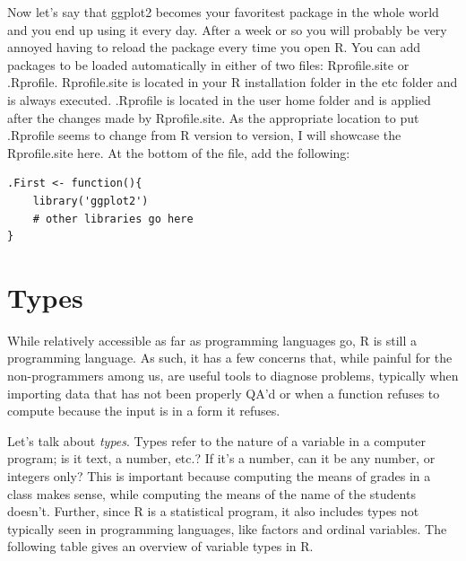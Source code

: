 \documentclass{report}
\newcommand{\code}[1]{\textsf{\ttfamily #1}}
\begin{document}
	Now let's say that \code{ggplot2} becomes your favoritest package in the whole world and you end up using it every day. After a week or so you will probably be very annoyed having to reload the package every time you open R. You can add packages to be loaded automatically in either of two files: \code{Rprofile.site} or \code{.Rprofile}. \code{Rprofile.site} is located in your R installation folder in the etc folder and is always executed. \code{.Rprofile} is located in the user home folder and is applied after the changes made by \code{Rprofile.site}. As the appropriate location to put \code{.Rprofile} seems to change from R version to version, I will showcase the \code{Rprofile.site} here. At the bottom of the file, add the following:
	\begin{verbatim}
.First <- function(){
	library('ggplot2')
	# other libraries go here
}
	\end{verbatim}

	\section{Types}\label{sec:types}
	While relatively accessible as far as programming languages go, R is still a programming language. As such, it has a few concerns that, while painful for the non-programmers among us, are useful tools to diagnose problems, typically when importing data that has not been properly QA'd or when a function refuses to compute because the input is in a form it refuses.

	Let's talk about \emph{types}. Types refer to the nature of a variable in a computer program; is it text, a number, etc.? If it's a number, can it be any number, or integers only? This is important because computing the means of grades in a class makes sense, while computing the means of the name of the students doesn't. Further, since R is a statistical program, it also includes types not typically seen in programming languages, like factors and ordinal variables. The following table gives an overview of variable types in R.
\end{document}
